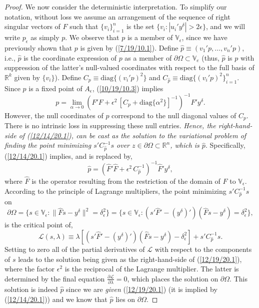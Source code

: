 \documentclass{amsart}
\numberwithin{equation}{section}
\theoremstyle{definition}
\numberwithin{theorem}{section}
\begin{document}
{\begin{proof}
We now consider the deterministic interpretation.   
To simplify our notation, without loss we assume an arrangement of the sequence of right singular vectors of $F$ such that $\{v_i\}_{i=1}^n$ is the set $\{v_i: |u_i'y^\delta| > 2\epsilon \}$, and we will write $p_\epsilon$ as simply $p$.  We observe that $p$ is a member of $\mathbb{V}_\epsilon$, since we have previously shown that $p$ is given by (\ref{7/19/10.1}). 
Define $\hat{p} \equiv (v_1'p,\dots,v_n'p)$, i.e., $\hat{p}$ is the coordinate expression of $p$ as a member of $\partial\Omega\subset \mathbb{V}_e$ (thus, $\hat{p}$ is $p$ with suppression of the latter's null-valued coordinates with respect to the full basis of $\mathbb{R}^k$ given by $\{v_i\}$). 
Define $C_p \equiv \mbox{diag}\{(v_i'p)^2\}$ and  $C_{\hat{p}} \equiv  \mbox{diag}\{(v_i'p)^2\}_{i=1}^n$.  Since $p$ is a fixed point of $A_\epsilon$,  (\ref{10/19/10.3}) implies \begin{equation} p = \lim_{\alpha\rightarrow 0} \left(F'F+\epsilon^2\,\left[C_p + \mbox{diag}\{\alpha^2\}\right]^{-1}\right)^{-1} F'y^\delta.\label{12/14/20.1}\end{equation} However, the null coordinates of $p$ correspond to the null diagonal values of $C_p$.  There is no intrinsic loss in suppressing these null entries.  {\it Hence, the right-hand-side of (\ref{12/14/20.1}), can be cast as the solution to the variational problem of finding the point minimizing $s'C^{-1}_{\hat{p}} s$ over $z\in \partial\Omega \subset \mathbb{R}^n$, which is $\hat{p}$}.
Specifically, (\ref{12/14/20.1}) implies, and is replaced by, 
\begin{equation} \hat{p} = \left(\hat{F}'\hat{F}+\epsilon^2\,C_{\hat{p}}^{-1}\right)^{-1} \hat{F}'y^\delta, \label{12/19/20.1}\end{equation} where $\hat{F}$ is the operator resulting from the restriction of the domain of $F$ to $\mathbb{V}_\epsilon$.
  According to the principle of Lagrange multipliers, the point minimizing $s'C^{-1}_{\hat{p}} s$ on \[ \partial\Omega = \{s\in \mathbb{V}_\epsilon: \| \hat{F} s -y^\delta\|^2 = \delta_\epsilon^2\} = \{s\in \mathbb{V}_\epsilon: (s'\hat{F}' - (y^{\delta})')(\hat{F} s - y^\delta) = \delta_\epsilon^2\},\] is the critical point of, \[ \mathcal{L}(s,\lambda) \equiv \lambda\left[ (s'\hat{F}' - (y^{\delta})')(\hat{F} s - y^\delta) -\delta_\epsilon^2\right] + s'C^{-1}_{\hat{p}} s.\] 
Setting to zero all of the partial derivatives of $\mathcal{L}$ with respect to the components of $s$ leads to the solution being given as the right-hand-side of (\ref{12/19/20.1}), where the factor $\epsilon^2$ is the reciprocal of the Lagrange multiplier.  The latter is determined by the final equation $\frac{\partial \mathcal{L}}{\partial \lambda} = 0$, which places the solution on $\partial\Omega$.  This solution is indeed $\hat{p}$ since we are {\it given} (\ref{12/19/20.1}) (it is implied by (\ref{12/14/20.1})) and we know that $\hat{p}$ lies on $\partial\Omega$. 


\end{proof}}
\end{document}
